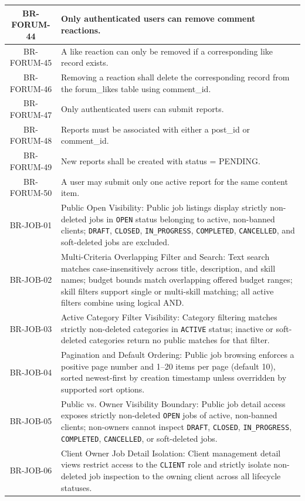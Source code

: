 \begin{longtable}{|c|p{12cm}|}
    BR-FORUM-44 & Only authenticated users can remove comment reactions. \\ \hline
    BR-FORUM-45 & A like reaction can only be removed if a corresponding like record exists. \\ \hline
    BR-FORUM-46 & Removing a reaction shall delete the corresponding record from the forum\_likes table using comment\_id. \\ \hline
    BR-FORUM-47 & Only authenticated users can submit reports. \\ \hline
    BR-FORUM-48 & Reports must be associated with either a post\_id or comment\_id. \\ \hline
    BR-FORUM-49 & New reports shall be created with status = PENDING. \\ \hline
    BR-FORUM-50 & A user may submit only one active report for the same content item. \\ \hline
    BR-JOB-01 & Public Open Visibility: Public job listings display strictly non-deleted jobs in \texttt{OPEN} status belonging to active, non-banned clients; \texttt{DRAFT}, \texttt{CLOSED}, \texttt{IN\_PROGRESS}, \texttt{COMPLETED}, \texttt{CANCELLED}, and soft-deleted jobs are excluded. \\ \hline
    BR-JOB-02 & Multi-Criteria Overlapping Filter and Search: Text search matches case-insensitively across title, description, and skill names; budget bounds match overlapping offered budget ranges; skill filters support single or multi-skill matching; all active filters combine using logical AND. \\ \hline
    BR-JOB-03 & Active Category Filter Visibility: Category filtering matches strictly non-deleted categories in \texttt{ACTIVE} status; inactive or soft-deleted categories return no public matches for that filter. \\ \hline
    BR-JOB-04 & Pagination and Default Ordering: Public job browsing enforces a positive page number and 1--20 items per page (default 10), sorted newest-first by creation timestamp unless overridden by supported sort options. \\ \hline
    BR-JOB-05 & Public vs. Owner Visibility Boundary: Public job detail access exposes strictly non-deleted \texttt{OPEN} jobs of active, non-banned clients; non-owners cannot inspect \texttt{DRAFT}, \texttt{CLOSED}, \texttt{IN\_PROGRESS}, \texttt{COMPLETED}, \texttt{CANCELLED}, or soft-deleted jobs. \\ \hline
    BR-JOB-06 & Client Owner Job Detail Isolation: Client management detail views restrict access to the \texttt{CLIENT} role and strictly isolate non-deleted job inspection to the owning client across all lifecycle statuses. \\ \hline

\end{longtable}
